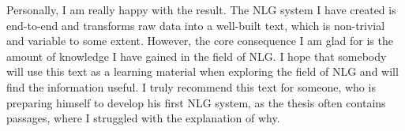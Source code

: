 Personally, I am really happy with the result. The NLG system I have created is end-to-end and transforms raw data into a well-built text, which is non-trivial and variable to some extent. However, the core consequence I am glad for is the amount of knowledge I have gained in the field of NLG. I hope that somebody will use this text as a learning material when exploring the field of NLG and will find the information useful. I truly recommend this text for someone, who is preparing himself to develop his first NLG system, as the thesis often contains passages, where I struggled with the explanation of why.
































